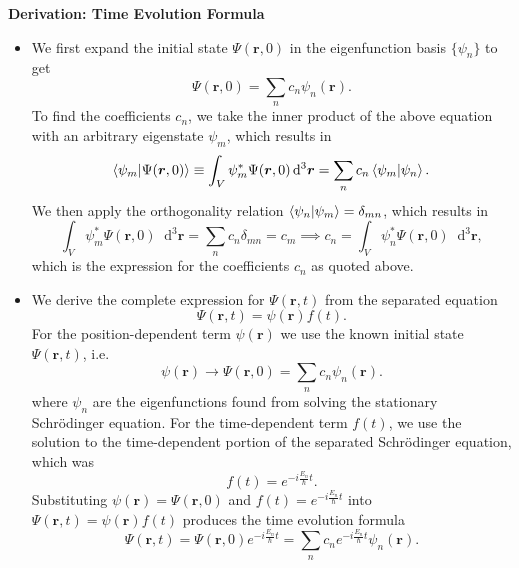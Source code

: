 \documentclass[11pt, a4paper]{article}
\newcommand{\diff}{\mathop{}\!\mathrm{d}} %
\newcommand{\dr}{\diff^{3} \r}  %
\newcommand{\Schro}{Schr\"{o}dinger\xspace}
\renewcommand{\vec}[1]{\bm{#1}}  %
\renewcommand{\r}{\vec{r}}  %
\newcommand{\p}{\psi}  %
\renewcommand{\P}{\Psi}  %
\begin{document}
\textbf{Derivation: Time Evolution Formula}
\begin{itemize}

    \item We first expand the initial state $ \P(\r, 0) $ in the eigenfunction basis $ \{\psi_{n}\} $ to get
	\begin{equation*}
		\P(\r, 0) = \sum_{n}c_{n} \p_{n}(\r).
	\end{equation*}
    To find the coefficients $ c_{n} $, we take the inner product of the above equation with an arbitrary eigenstate $ \psi_{m} $, which results in
    \begin{equation*}
        \ip{\psi_{m}}{\Psi(\r, 0)} \equiv \int_{V}\psi_{m}^{*}\Psi(\r, 0) \dr = \sum_{n}c_{n} \ip{\psi_{m}}{\psi_{n}}. 
    \end{equation*}
    We then apply the orthogonality relation $ \ip{\psi_{n}}{\psi_{m}} = \delta_{mn} $, which results in
    \begin{equation*}
        \int_{V}\psi_{m}^{*} \Psi(\r, 0) \dr = \sum_{n}c_{n} \delta_{mn} = c_{m} \implies c_{n} = \int_{V} \p_{n}^{*}\P(\r, 0)\dr,
    \end{equation*}
    which is the expression for the coefficients $ c_{n} $ as quoted above.
    
    \item We derive the complete expression for $ \Psi(\r, t) $ from the separated equation
    \begin{equation*}
        \Psi(\r, t) = \psi(\r) f(t).
    \end{equation*}
    For the position-dependent term $ \psi(\r) $ we use the known initial state $ \Psi(\r, t) $, i.e.
    \begin{equation*}
        \psi(\r) \to \Psi(\r, 0) = \sum_{n}c_{n}\psi_{n}(\r).
    \end{equation*}
    where $ \psi_{n} $ are the eigenfunctions found from solving the stationary \Schro equation. For the time-dependent term $ f(t) $, we use the solution to the time-dependent portion of the separated \Schro equation, which was
    \begin{equation*}
        f(t) = e^{-i \frac{E_{n}}{\hbar}t}.
    \end{equation*}
    Substituting $ \psi(\r) = \Psi(\r, 0) $ and $ f(t) = e^{-i \frac{E_{n}}{\hbar}t} $ into $ \Psi(\r, t) = \psi(\r) f(t) $ produces the time evolution formula
	\begin{equation*}
        \P(\r, t) = \Psi(\r, 0)e^{-i \frac{E_{n}}{\hbar}t} = \sum_{n}c_{n}e^{-i\frac{E_{n}}{\hbar}t}\p_{n}(\r).
	\end{equation*}

\end{itemize}
\end{document}

